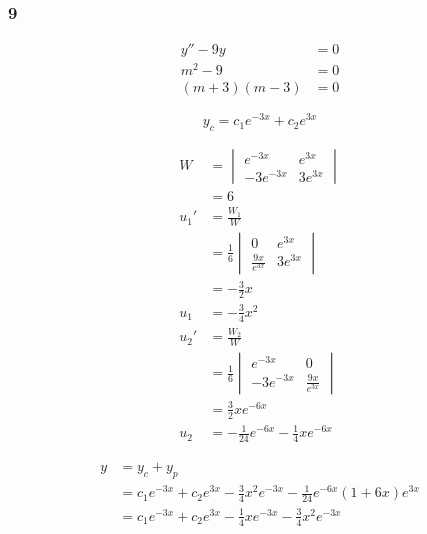 \documentclass{article}
\begin{document}
\subsubsection{9}

\begin{align*}
  y'' - 9y        & = 0 \\
  m^2 - 9         & = 0 \\
  (m + 3) (m - 3) & = 0
\end{align*}

\[y_c = c_1 e^{-3x} + c_2 e^{3x}\]

\begin{align*}
  W    & = \begin{vmatrix}
             e^{-3x}   & e^{3x}  \\
             -3e^{-3x} & 3e^{3x}
           \end{vmatrix}                                               \\
       & = 6                                                                 \\
  u_1' & = \frac{W_1}{W}                                                     \\
       & = \frac{1}{6} \begin{vmatrix}
                         0                 & e^{3x}  \\
                         \frac{9x}{e^{3x}} & 3e^{3x}
                       \end{vmatrix}   \\
       & = -\frac{3}{2} x                                                    \\
  u_1  & = -\frac{3}{4} x^2                                                  \\
  u_2' & = \frac{W_2}{W}                                                     \\
       & = \frac{1}{6} \begin{vmatrix}
                         e^{-3x}   & 0                 \\
                         -3e^{-3x} & \frac{9x}{e^{3x}}
                       \end{vmatrix} \\
       & = \frac{3}{2} xe^{-6x}                                              \\
  u_2  & = -\frac{1}{24} e^{-6x} - \frac{1}{4} x e^{-6x}
\end{align*}

\begin{align*}
  y & = y_c + y_p                                                                                 \\
    & = c_1 e^{-3x} + c_2 e^{3x} - \frac{3}{4} x^2 e^{-3x} - \frac{1}{24} e^{-6x} (1 + 6x) e^{3x} \\
    & = c_1 e^{-3x} + c_2 e^{3x} - \frac{1}{4} x e^{-3x} - \frac{3}{4} x^2 e^{-3x}
\end{align*}
\end{document}
